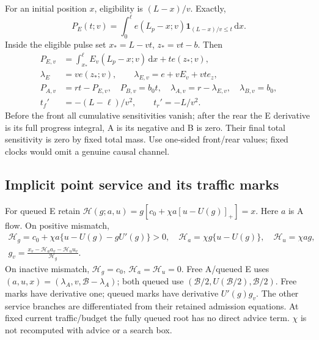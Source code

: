 \documentclass[11pt,a4paper]{article}
\newcommand{\pos}[1]{[#1]_+}
\newcommand{\dd}{\,\mathrm d}
\newcommand{\Bud}{\mathcal B}
\newcommand{\He}{\mathcal H}
\begin{document}
For an initial position $x$, eligibility is $(L-x)/v$. Exactly,
\begin{equation}
 P_E(t;v)=\int_0^\ell e(L_p-x;v)\mathbf1_{(L-x)/v\leq t}\dd x.
 \label{eq:PE}
\end{equation}
Inside the eligible pulse set $x_*=L-vt$, $z_*=vt-b$. Then
\begin{align}
 P_{E,v}&=\int_{x_*}^\ell E_v(L_p-x;v)\dd x+t e(z_*;v),\nonumber\\
 \lambda_E&=ve(z_*;v),\qquad
 \lambda_{E,v}=e+vE_v+vt e_z,\nonumber\\
 P_{A,v}&=rt-P_{E,v},\quad P_{B,v}=b_0t,\quad
 \lambda_{A,v}=r-\lambda_{E,v},\quad\lambda_{B,v}=b_0,\nonumber\\
 t_f'&=-(L-\ell)/v^2,\qquad t_r'=-L/v^2.
 \label{eq:arrivalsensitivity}
\end{align}
Before the front all cumulative sensitivities vanish; after the rear the
E derivative is its full progress integral, A is its negative and B is zero.
Their final total sensitivity is zero by fixed total mass. Use one-sided
front/rear values; fixed clocks would omit a genuine causal channel.

\subsection{Implicit point service and its traffic marks}
For queued E retain $\He(g;a,u)=g[c_0+\chi a\pos{u-U(g)}]=x$.
Here $a$ is A flow. On positive mismatch,
\begin{equation}
 \begin{gathered}
 \He_g=c_0+\chi a\{u-U(g)-gU'(g)\}>0,\quad
 \He_a=\chi g\{u-U(g)\},\quad\He_u=\chi ag,\\
 g_v=\frac{x_v-\He_a a_v-\He_u u_v}{\He_g}.
 \end{gathered}\label{eq:rootsensitivity}
\end{equation}
On inactive mismatch, $\He_g=c_0$, $\He_a=\He_u=0$.
Free A/queued E uses $(a,u,x)=(\lambda_A,v,\Bud-\lambda_A)$;
both queued use $(\Bud/2,U(\Bud/2),\Bud/2)$.
Free marks have derivative one; queued marks have derivative $U'(g)g_v$.
The other service branches are differentiated from their retained admission
equations. At fixed current traffic/budget the fully queued root has no
direct advice term. $\chi$ is not recomputed with advice or a search box.
\end{document}
